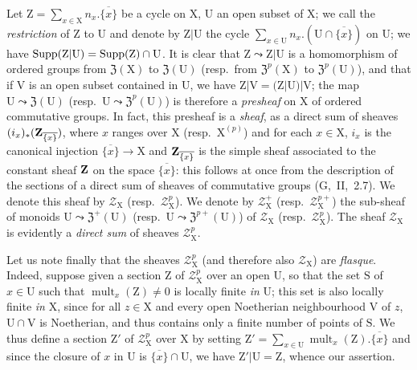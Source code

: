 \begin{env}[21.6.3]
\label{IV.21.6.3}
Let $\mathrm{Z}=\sum_{x\in\mathrm{X}}n_x.\overline{\{x\}}$ be a cycle on $\mathrm{X}$, $\mathrm{U}$ an open subset of $\mathrm{X}$;
we call the \emph{restriction} of $\mathrm{Z}$ to $\mathrm{U}$ and denote by $\mathrm{Z}|\mathrm{U}$ the cycle $\sum_{x\in\mathrm{U}}n_x.(\mathrm{U}\cap\overline{\{x\}})$ on $\mathrm{U}$;
we have $\operatorname{Supp}(\mathrm{Z}|\mathrm{U})=\operatorname{Supp}(\mathrm{Z})\cap\mathrm{U}$.
It is clear that $\mathrm{Z}\leadsto\mathrm{Z}|\mathrm{U}$ is a homomorphism of ordered groups from $\mathfrak{Z}(\mathrm{X})$ to $\mathfrak{Z}(\mathrm{U})$ (resp.\ from $\mathfrak{Z}^p(\mathrm{X})$ to $\mathfrak{Z}^p(\mathrm{U})$), and that if $\mathrm{V}$ is an open subset contained in $\mathrm{U}$, we have $\mathrm{Z}|\mathrm{V}=(\mathrm{Z}|\mathrm{U})|\mathrm{V}$;
the map $\mathrm{U}\leadsto\mathfrak{Z}(\mathrm{U})$ (resp.\ $\mathrm{U}\leadsto\mathfrak{Z}^{p}(\mathrm{U})$) is therefore a \emph{presheaf} on $\mathrm{X}$ of ordered commutative groups.
In fact, this presheaf is a \emph{sheaf}, as a direct sum of sheaves $(i_x)_*(\mathbf{Z}_{\overline{\{x\}}})$, where $x$ ranges over $\mathrm{X}$ (resp.\ $\mathrm{X}^{(p)}$) and for each $x\in\mathrm{X}$, $i_x$ is the canonical injection $\overline{\{x\}}\to\mathrm{X}$ and $\mathbf{Z}_{\overline{\{x\}}}$ is the simple sheaf associated to the constant sheaf $\mathbf{Z}$ on the space $\overline{\{x\}}$:
this follows at once from the description of the sections of a direct sum of sheaves of commutative groups (G,~II,~2.7).
We denote this sheaf by $\mathscr{Z}_\mathrm{X}$ (resp.\ $\mathscr{Z}_\mathrm{X}^p$).
We denote by $\mathscr{Z}_\mathrm{X}^+$ (resp.\ $\mathscr{Z}_\mathrm{X}^{p+}$) the sub-sheaf
of monoids $\mathrm{U}\leadsto\mathfrak{Z}^+(\mathrm{U})$ (resp.\ $\mathrm{U}\leadsto\mathfrak{Z}^{p+}(\mathrm{U})$) of $\mathscr{Z}_\mathrm{X}$ (resp.\ $\mathscr{Z}_\mathrm{X}^p$).
The sheaf $\mathscr{Z}_\mathrm{X}$ is evidently a \emph{direct sum} of sheaves $\mathscr{Z}_\mathrm{X}^p$.

Let us note finally that the sheaves $\mathscr{Z}_\mathrm{X}^p$ (and therefore also $\mathscr{Z}_\mathrm{X}$) are \emph{flasque}.
Indeed, suppose given a section $\mathrm{Z}$ of $\mathscr{Z}_\mathrm{X}^p$ over an open $\mathrm{U}$, so that the set $\mathrm{S}$ of $x\in\mathrm{U}$ such that $\operatorname{mult}_x(\mathrm{Z})\neq 0$ is locally finite \emph{in} $\mathrm{U}$;
this set is also locally finite \emph{in} $\mathrm{X}$, since for all $z\in\mathrm{X}$ and every open Noetherian neighbourhood $\mathrm{V}$ of $z$, $\mathrm{U}\cap\mathrm{V}$ is Noetherian, and thus contains only a finite number of points of $\mathrm{S}$.
We thus define a section $\mathrm{Z}'$ of $\mathscr{Z}_\mathrm{X}^p$ over $\mathrm{X}$ by setting $\mathrm{Z}'=\sum_{x\in\mathrm{U}}\operatorname{mult}_x(\mathrm{Z}).\overline{\{x\}}$ and since the closure of $x$ in $\mathrm{U}$ is $\overline{\{x\}}\cap\mathrm{U}$, we have $\mathrm{Z}'|\mathrm{U}=\mathrm{Z}$, whence our assertion.
\end{env}

